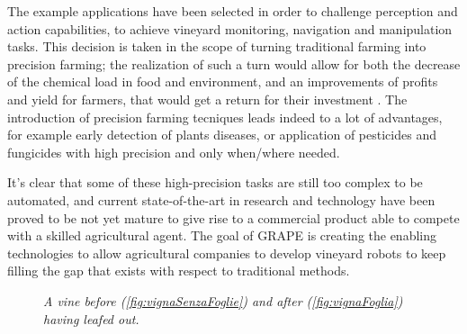 The example applications have been selected in order to challenge perception and action capabilities, to achieve vineyard monitoring, navigation and manipulation tasks. This decision is taken in the scope of turning traditional farming into precision farming; the realization of such a turn would allow for both the decrease of the chemical load in food and environment, and an improvements of profits and yield for farmers, that would get a return for their investment \parencite{precisionFarming}. The introduction of precision farming tecniques leads indeed to a lot of advantages, for example early detection of plants diseases, or application of pesticides and fungicides with high precision and only when/where needed.

It's clear that some of these high-precision tasks are still too complex to be automated, and current state-of-the-art in research and technology have been proved to be not yet mature to give rise to a commercial product able to compete with a skilled agricultural agent. The goal of \ac{GRAPE} is creating the enabling technologies to allow agricultural companies to develop vineyard robots to keep filling the gap that exists with respect to traditional methods.

\begin{figure}
	\centering
	\qquad
	\caption{\textit{A vine before (\ref{fig:vignaSenzaFoglie}) and after (\ref{fig:vignaFoglia}) having leafed out.}}
	\label{fig:vignaConSenzaFoglie}
\end{figure}


